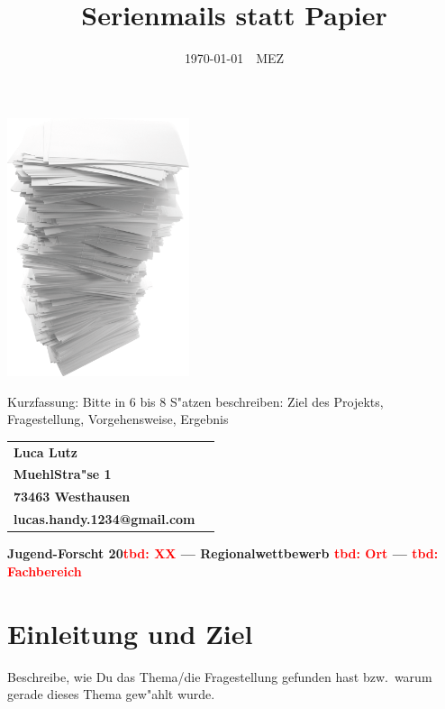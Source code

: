 \documentclass[10pt,twoside]{article}  %
\newcommand{\tbd}[1]{\textcolor{red}{\large \bf tbd: #1}}
\begin{document}
  \title{Serienmails statt Papier}
  \setlength{\parskip}{0ex}
  \date{\today \ \currenttime \ MEZ}
  \maketitle
  \begin{center}
     \includegraphics[width=0.4\textwidth]{Titelbild.png}
  \end{center}

  \hrulefill
  Kurzfassung: Bitte in 6 bis 8 S"atzen beschreiben: Ziel des Projekts,
    Fragestellung, Vorgehensweise, Ergebnis %
  \hrulefill

  \vfill
  \begin{center}
  \begin{tabular}{C{0.5\textwidth}C{0.5\textwidth}}
    \textbf{Luca Lutz} \\
    \textbf{MuehlStra"se 1} \\
    \textbf{73463 Westhausen} \\
    \textbf{lucas.handy.1234@gmail.com} \\
  \end{tabular}
  \end{center}
  \vfill

  \hrulefill

  \parbox{\textwidth}{\centering \bf Jugend-Forscht 20\tbd{XX} ---
    Regionalwettbewerb \tbd{Ort} --- \tbd{Fachbereich}}
  \thispagestyle{empty}
  \newpage

  \tableofcontents
  \listoffigures
  \listoftables
  \setlength{\parskip}{1ex}
  \cleardoublepage


  \section{Einleitung und Ziel} %
    Beschreibe, wie Du das Thema/die Fragestellung gefunden hast bzw.\ warum
    gerade dieses Thema gew"ahlt wurde.
\end{document}
